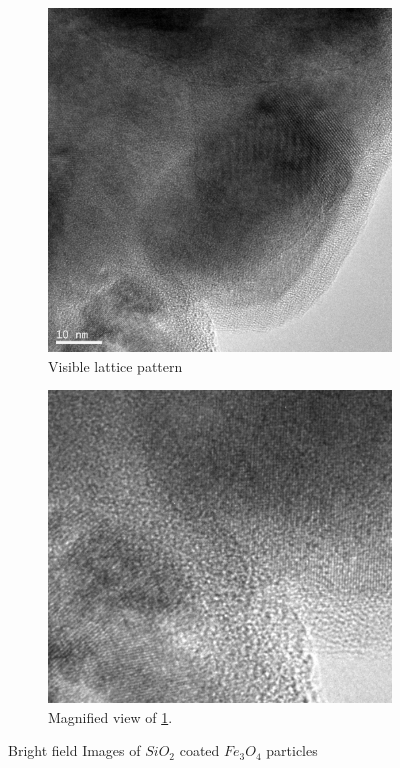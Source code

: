 \documentclass[12pt,a4paper]{article}
\begin{document}
\begin{figure}[htbp]
  \begin{subfigure}[b]{0.45\textwidth}
    \includegraphics[width=\textwidth]{Data/Fe3O4-SiO2-0003.png}
    \caption{Visible lattice pattern}
    \label{fig:viewc}
  \end{subfigure}
  \begin{subfigure}[b]{0.45\textwidth}
    \includegraphics[width=\textwidth]{Data/Fe3O4-SiO2-0003-zoom.png}
    \caption{Magnified view of \ref{fig:viewc}.  }
    \label{fig:zoom}
  \end{subfigure}
  
  \caption{Bright field Images of $SiO_2$ coated $Fe_3O_4$ particles}\label{fig:brightfield}
\end{figure}
\end{document}
